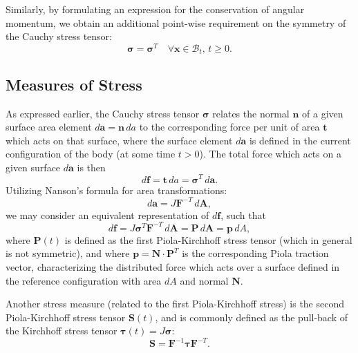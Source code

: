 Similarly, by formulating an expression for the conservation of angular momentum, we obtain an additional point-wise requirement on the symmetry of the Cauchy stress tensor:
\begin{equation}
  \boldsymbol{\sigma} = \boldsymbol{\sigma}^T \quad \forall \mathbf{x} \in \mathcal{B}_t, \, t \geq 0.
\end{equation}

\subsection*{Measures of Stress}

As expressed earlier, the Cauchy stress tensor $\boldsymbol{\sigma}$ relates the normal $\mathbf{n}$ of a given surface area element $d \mathbf{a} = \mathbf{n} \, da$ to the corresponding force per unit of area $\mathbf{t}$ which acts on that surface, where the surface element $d \mathbf{a}$ is defined in the current configuration of the body (at some time $t > 0$). The total force which acts on a given surface $d \mathbf{a}$ is then
\begin{equation}
  d \mathbf{f} = \mathbf{t} \, da = \boldsymbol{\sigma}^T \, d \mathbf{a}.
\end{equation}
Utilizing Nanson's formula for area transformations:
\begin{equation}
  d \mathbf{a} = J \mathbf{F}^{-T} \, d \mathbf{A},
\end{equation}
we may consider an equivalent representation of $d \mathbf{f}$, such that
\begin{equation}
  d \mathbf{f} = J \boldsymbol{\sigma}^T \mathbf{F}^{-T} \, d \mathbf{A} = \mathbf{P} \, d \mathbf{A} = \mathbf{p} \, dA,
\end{equation}
where $\mathbf{P}(t)$ is defined as the first Piola-Kirchhoff stress tensor (which in general is not symmetric), and where $\mathbf{p} = \mathbf{N} \cdot \mathbf{P}^T$ is the corresponding Piola traction vector, characterizing the distributed force which acts over a surface defined in the reference configuration with area $dA$ and normal $\mathbf{N}$.

Another stress measure (related to the first Piola-Kirchhoff stress) is the second Piola-Kirchhoff stress tensor $\mathbf{S}(t)$, and is commonly defined as the pull-back of the Kirchhoff stress tensor $\boldsymbol{\tau}(t) = J \boldsymbol{\sigma}$:
\begin{equation}
  \mathbf{S} = \mathbf{F}^{-1} \boldsymbol{\tau} \mathbf{F}^{-T}.
\end{equation}

